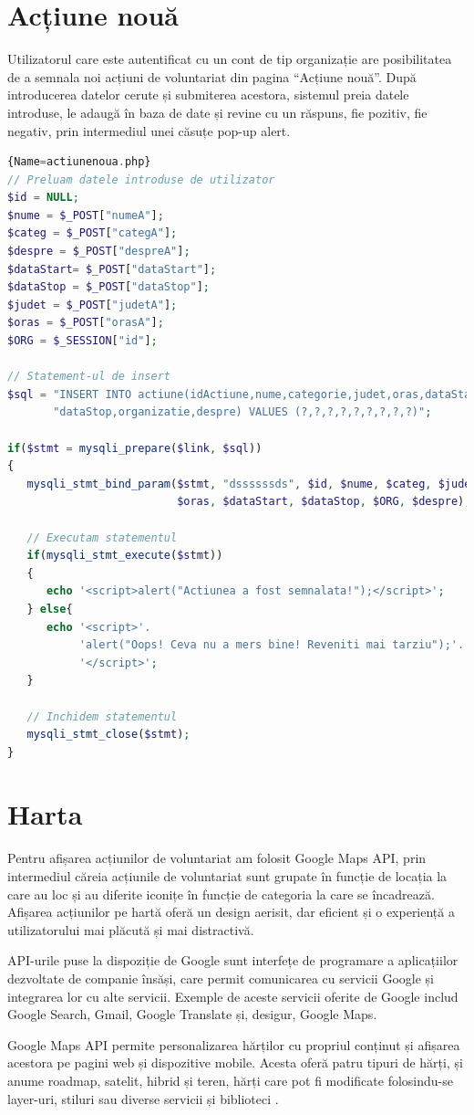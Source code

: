 \documentclass[12pt,a4paper]{report}
\begin{document}
\section{Acțiune nouă}
\par
Utilizatorul care este autentificat cu un cont de tip organizație are posibilitatea de a semnala noi acțiuni de voluntariat din pagina  “Acțiune nouă”. După introducerea datelor cerute și submiterea acestora, sistemul preia datele introduse, le adaugă în baza de date și revine cu un răspuns, fie pozitiv, fie negativ, prin intermediul unei căsuțe pop-up alert.
\\
\begin{lstlisting}[basicstyle=\small, language=PHP]{Name=actiunenoua.php}
// Preluam datele introduse de utilizator
$id = NULL;
$nume = $_POST["numeA"];
$categ = $_POST["categA"];
$despre = $_POST["despreA"];
$dataStart= $_POST["dataStart"];
$dataStop = $_POST["dataStop"];
$judet = $_POST["judetA"];
$oras = $_POST["orasA"];
$ORG = $_SESSION["id"];

// Statement-ul de insert
$sql = "INSERT INTO actiune(idActiune,nume,categorie,judet,oras,dataStart,".
       "dataStop,organizatie,despre) VALUES (?,?,?,?,?,?,?,?,?)";

if($stmt = mysqli_prepare($link, $sql))
{
   mysqli_stmt_bind_param($stmt, "dssssssds", $id, $nume, $categ, $judet, 
                          $oras, $dataStart, $dataStop, $ORG, $despre);

   // Executam statementul
   if(mysqli_stmt_execute($stmt))
   {
      echo '<script>alert("Actiunea a fost semnalata!");</script>';
   } else{
      echo '<script>'.
           'alert("Oops! Ceva nu a mers bine! Reveniti mai tarziu");'.
           '</script>';
   }

   // Inchidem statementul
   mysqli_stmt_close($stmt);
}
\end{lstlisting}

\section{Harta}
\par
Pentru afișarea acțiunilor de voluntariat am folosit Google Maps API, prin intermediul căreia acțiunile de voluntariat sunt grupate în funcție de locația la care au loc și au diferite iconițe în funcție de categoria la care se încadrează. Afișarea acțiunilor pe hartă oferă un design aerisit, dar eficient și o experiență a utilizatorului mai plăcută și mai distractivă.
\\
\par
API-urile puse la dispoziție de Google sunt interfețe de programare a aplicațiilor dezvoltate de companie însăși, care permit comunicarea cu servicii Google și integrarea lor cu alte servicii. Exemple de aceste servicii oferite de Google includ Google Search, Gmail, Google Translate și, desigur, Google Maps.
\par
Google Maps API permite personalizarea hărților cu propriul conținut și afișarea acestora pe pagini web și dispozitive mobile. Acesta oferă patru tipuri de hărți, și anume roadmap, satelit, hibrid și teren, hărți care pot fi modificate folosindu-se layer-uri, stiluri sau diverse servicii și biblioteci \cite{gmaps}.
\end{document}
